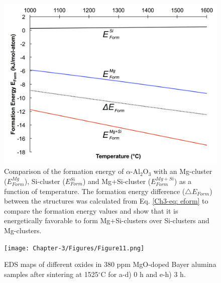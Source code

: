 \newpage
\begin{figure}[H]
	\centering
	\includegraphics[width=\textwidth]{Chapter-3/Figures/Figure10.png}
	\caption{Comparison of the formation energy of $\alpha$-Al$_{2}$O$_{3}$ with an Mg-cluster ($E_{Form}^{Mg}$), Si-cluster ($E_{Form}^{Si}$) and Mg+Si-cluster ($E_{Form}^{Mg+Si}$) as a function of temperature. The formation energy difference ($\bigtriangleup E_{Form}$) between the structures was calculated from Eq. \ref{Ch3-eq: eform} to compare the formation energy values and show that it is energetically favorable to form Mg+Si-clusters over Si-clusters and Mg-clusters.}
	\label{Ch3-figure:Figure10}
\end{figure}

\newpage
\begin{figure}[H]
	\centering
	\texttt{[image: Chapter-3/Figures/Figure11.png]}
	\caption{EDS maps of different oxides in 380 ppm MgO-doped Bayer alumina samples after sintering at 1525$^{\circ}$C for a-d) 0 h and e-h) 3 h.}
	\label{Ch3-figure:Figure11}
\end{figure}

